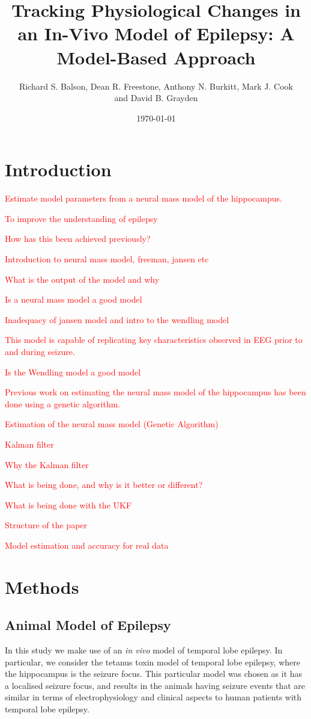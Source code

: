 \documentclass{article}%
\title{Tracking Physiological Changes in an In-Vivo Model of Epilepsy: A Model-Based Approach}
\date{\today}
\author{Richard S. Balson, Dean R. Freestone, Anthony N. Burkitt, Mark J. Cook \\ and David B. Grayden}
\newcommand\red{\textcolor{red}}
\begin{document}
\maketitle

\section{Introduction}

\red{Estimate model parameters from a neural mass model of the hippocampus.}

\red{To improve the understanding of epilepsy} 

\red{How has this been achieved previously?}

\red{Introduction to neural mass model, freeman, jansen etc}

\red{What is the output of the model and why}

\red{Is a neural mass model a good model}

\red{Inadequacy of jansen model and intro to the wendling model}

\red{This model is capable of replicating key characteristics observed in EEG prior to and during seizure.}

\red{Is the Wendling model a good model}

\red{Previous work on estimating the neural mass model of the hippocampus has been done using a genetic algorithm.}

\red{Estimation of the neural mass model (Genetic Algorithm)}

\red{Kalman filter}

\red{Why the Kalman filter}

\red{What is being done, and why is it better or different?}

\red{What is being done with the UKF}

\red{Structure of the paper}

\red{Model estimation and accuracy for real data}

\section{Methods}

\subsection{Animal Model of Epilepsy}

In this study we make use of an \textsl{in vivo} model of temporal lobe epilepsy. In particular, we consider the tetanus toxin model of temporal lobe epilepsy, where the hippocampus is the seizure focus. This particular model was chosen as it has a localised seizure focus, and results in the animals having seizure events that are similar in terms of electrophysiology and clinical aspects to human patients with temporal lobe epilepsy. 
\end{document}
